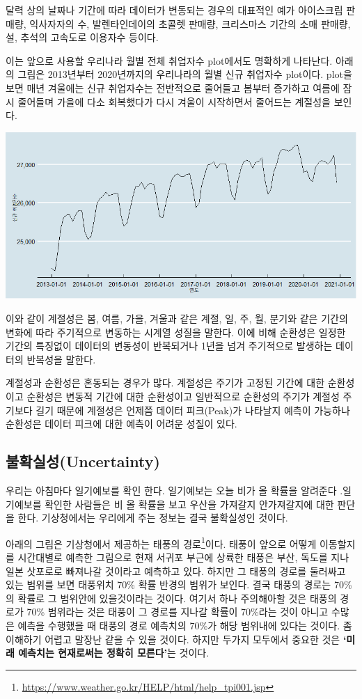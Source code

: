 \documentclass[
]{book}
\begin{document}
달력 상의 날짜나 기간에 따라 데이터가 변동되는 경우의 대표적인 예가 아이스크림 판매량, 익사자자의 수, 발렌타인데이의 초콜렛 판매량, 크리스마스 기간의 소매 판매량, 설, 추석의 고속도로 이용자수 등이다.

이는 앞으로 사용할 우리나라 월별 전체 취업자수 plot에서도 명확하게 나타난다. 아래의 그림은 2013년부터 2020년까지의 우리나라의 월별 신규 취업자수 plot이다. plot을 보면 매년 겨울에는 신규 취업자수는 전반적으로 줄어들고 봄부터 증가하고 여름에 잠시 줄어들며 가을에 다소 회복했다가 다시 겨울이 시작하면서 줄어드는 계절성을 보인다.

\includegraphics{season.png}

이와 같이 계절성은 봄, 여름, 가을, 겨울과 같은 계절, 일, 주, 월, 분기와 같은 기간의 변화에 따라 주기적으로 변동하는 시계열 성질을 말한다. 이에 비해 순환성은 일정한 기간의 특징없이 데이터의 변동성이 반복되거나 1년을 넘겨 주기적으로 발생하는 데이터의 반복성을 말한다.

계절성과 순환성은 혼동되는 경우가 많다. 계절성은 주기가 고정된 기간에 대한 순환성이고 순환성은 변동적 기간에 대한 순환성이고 일반적으로 순환성의 주기가 계절성 주기보다 길기 때문에 계절성은 언제쯤 데이터 피크(Peak)가 나타날지 예측이 가능하나 순환성은 데이터 피크에 대한 예측이 어려운 성질이 있다.

\hypertarget{uxbd88uxd655uxc2e4uxc131uncertainty}{%
\subsection{불확실성(Uncertainty)}\label{uxbd88uxd655uxc2e4uxc131uncertainty}}

우리는 아침마다 일기예보를 확인 한다. 일기예보는 오늘 비가 올 확률을 알려준다 .일기예보를 확인한 사람들은 비 올 확률을 보고 우산을 가져갈지 안가져갈지에 대한 판단을 한다. 기상청에서는 우리에게 주는 정보는 결국 불확실성인 것이다.

아래의 그림은 기상청에서 제공하는 태풍의 경로\footnote{\url{https://www.weather.go.kr/HELP/html/help_tpi001.jsp}}이다. 태풍이 앞으로 어떻게 이동할지를 시간대별로 예측한 그림으로 현재 서귀포 부근에 상륙한 태풍은 부산, 독도를 지나 일본 삿포로로 빠져나갈 것이라고 예측하고 있다. 하지만 그 태풍의 경로를 둘러싸고 있는 범위를 보면 태풍위치 70\% 확률 반경의 범위가 보인다. 결국 태풍의 경로는 70\%의 확률로 그 범위안에 있을것이라는 것이다. 여기서 하나 주의해아할 것은 태풍의 경로가 70\% 범위라는 것은 태풍이 그 경로를 지나갈 확률이 70\%라는 것이 아니고 수많은 예측을 수행했을 때 태풍의 경로 예측치의 70\%가 해당 범위내에 있다는 것이다. 좀 이해하기 어렵고 말장난 같을 수 있을 것이다. 하지만 두가지 모두에서 중요한 것은 \textbf{`미래 예측치는 현재로써는 정확히 모른다'}는 것이다.
\end{document}
